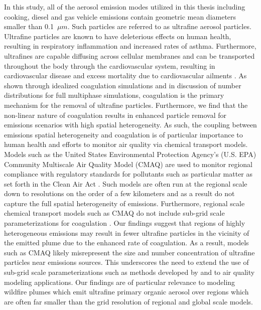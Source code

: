 In this study, all of the aerosol emission modes utilized in this thesis including cooking, diesel and gas vehicle emissions contain geometric mean diameters smaller than 0.1~$\mu m$. Such particles are referred to as ultrafine aerosol particles. Ultrafine particles are known to have deleterious effects on human health, resulting in respiratory inflammation and increased rates of asthma. Furthermore, ultrafines are capable diffusing across cellular membranes and can be transported throughout the body through the cardiovascular system, resulting in cardiovascular disease and excess mortality due to cardiovascular ailments \parencite{schraufnagel_health_2020}. As shown through idealized coagulation simulations and in discussion of number distributions for full multiphase simulations, coagulation is the primary mechanism for the removal of ultrafine particles. Furthermore, we find that the non-linear nature of coagulation results in enhanced particle removal for emissions scenarios with high spatial heterogeneity. As such, the coupling between emissions spatial heterogeneity and coagulation is of particular importance to human health and efforts to monitor air quality via chemical transport models. Models such as the United States Environmental Protection Agency's (U.S. EPA) Community Multiscale Air Quality Model (CMAQ) are used to monitor regional compliance with regulatory standards for pollutants such as particular matter as set forth in the Clean Air Act \parencite{development_cmaq_2022}. Such models are often run at the regional scale down to resolutions on the order of a few kilometers and as a result do not capture the full spatial heterogeneity of emissions. Furthermore, regional scale chemical transport models such as CMAQ do not include sub-grid scale parameterizations for coagulation \parencite{murphy_communication_2024}. Our findings suggest that regions of highly heterogeneous emissions may result in fewer ultrafine particles in the vicinity of the emitted plume due to the enhanced rate of coagulation. As a result, models such as CMAQ likely misrepresent the size and number concentration of ultrafine particles near emissions sources. This underscores the need to extend the use of sub-grid scale parameterizations such as methods developed by \textcite{pierce_parameterization_2009} and \textcite{sakamoto_evolution_2016} to air quality modeling applications. Our findings are of particular relevance to modeling wildfire plumes which emit ultrafine primary organic aerosol over regions which are often far smaller than the grid resolution of regional and global scale models. 

